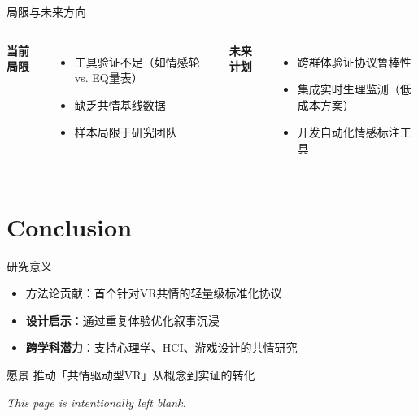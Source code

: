 \documentclass[aspectratio=169,xcolor=dvipsnames]{beamer}
\begin{document}
\begin{frame}{局限与未来方向}
    \begin{columns}[t]
        \textbf{当前局限}
        \begin{itemize}
            \item 工具验证不足（如情感轮 vs. EQ量表）
            \item 缺乏共情基线数据
            \item 样本局限于研究团队
        \end{itemize}
        
        \textbf{未来计划}
        \begin{itemize}
            \item 跨群体验证协议鲁棒性
            \item 集成实时生理监测（低成本方案）
            \item 开发自动化情感标注工具
        \end{itemize}
    \end{columns}
\end{frame}

\section{Conclusion}

\begin{frame}{研究意义}
    \begin{itemize}
        \item \alert{方法论贡献}：首个针对VR共情的轻量级标准化协议
        \item \textbf{设计启示}：通过重复体验优化叙事沉浸
        \item \textbf{跨学科潜力}：支持心理学、HCI、游戏设计的共情研究
    \end{itemize}
    
    \begin{block}{愿景}
        推动「共情驱动型VR」从概念到实证的转化
    \end{block}
\end{frame}


\begin{frame}
    \begin{center}
        \textit{This page is intentionally left blank.}
    \end{center}
\end{frame}
\end{document}
